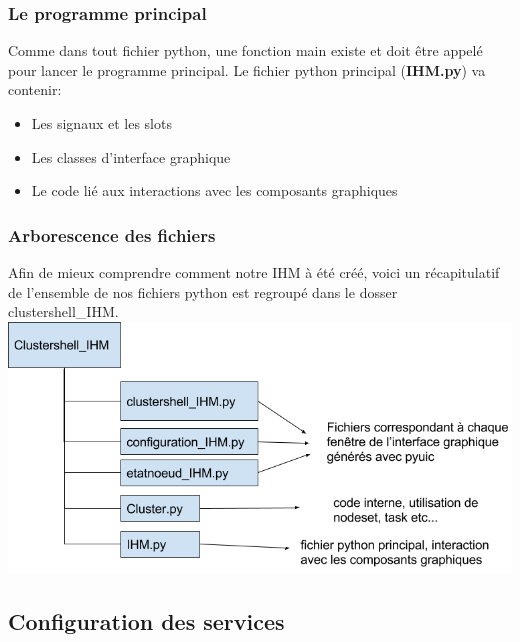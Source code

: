 \documentclass[a4paper,11pt]{article}
\begin{document}
\subsubsection{Le programme principal}

Comme dans tout fichier python, une fonction main existe et doit être appelé pour lancer le programme principal. Le fichier python principal (\textbf{IHM.py}) va contenir:
\begin{itemize}
\item Les signaux et les slots
\item Les classes d'interface graphique
\item Le code lié aux interactions avec les composants graphiques
\end{itemize}
\subsubsection{Arborescence des fichiers}
Afin de mieux comprendre comment notre IHM à été créé, voici un récapitulatif de l'ensemble de nos fichiers python est regroupé dans le dosser clustershell\_IHM.\\
\includegraphics[scale=0.5]{arborescence_fichiers_IHM.jpg} 

\subsection{Configuration des services}
\end{document}
